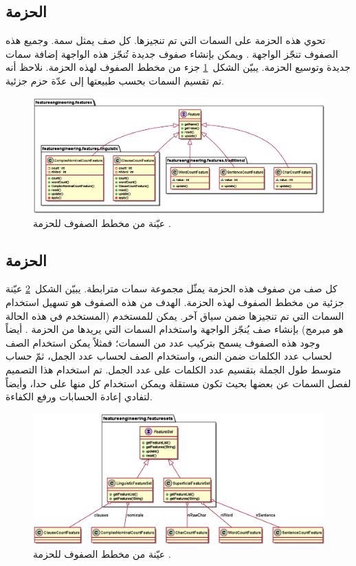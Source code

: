 \subsection{الحزمة }
تحوي هذه الحزمة على السمات التي تم تنجيزها.
كل صف يمثل سمة.
وجميع هذه الصفوف تنجّز الواجهة .
ويمكن بإنشاء صفوف جديدة تُنجّز هذه الواجهة إضافة سمات جديدة وتوسيع الحزمة.
يبيّن الشكل~\ref{fig:cd:features} جزء من مخطط الصفوف لهذه الحزمة.
نلاحظ أنه تم تقسيم السمات بحسب طبيعتها إلى عدّة حزم جزئية.

\begin{figure}[htb]
	\centering
	\includegraphics[width=0.95\linewidth]{images/cd-features.eps}
	\caption{%
		عيّنة من مخطط الصفوف للحزمة .
	}
	\label{fig:cd:features}
\end{figure}



\subsection{الحزمة }
كل صف من صفوف هذه الحزمة يمثّل مجموعة سمات مترابطة.
يبيّن الشكل~\ref{fig:cd:featuresets} عيّنة جزئية من مخطط الصفوف لهذه الحزمة.
الهدف من هذه الصفوف هو تسهيل استخدام السمات التي تم تنجيزها ضمن سياق آخر.
يمكن للمستخدم (المستخدم في هذه الحالة هو مبرمج) بإنشاء صف يُنجّز الواجهة 
واستخدام السمات التي يريدها من الحزمة .
أيضاً وجود هذه الصفوف يسمح بتركيب عدد من السمات؛
فمثلاً يمكن استخدام الصف  لحساب عدد الكلمات ضمن النص،
واستخدام الصف  لحساب عدد الجمل،
ثمّ حساب متوسط طول الجملة بتقسيم عدد الكلمات على عدد الجمل.
تم استخدام هذا التصميم لفصل السمات عن بعضها بحيث تكون مستقلة ويمكن استخدام كل منها على حدا،
وأيضاً لتفادي إعادة الحسابات ورفع الكفاءة.


\begin{figure}[htb]
	\centering
	\includegraphics[width=0.95\linewidth]{images/cd-featuresets.eps}
	\caption{%
		عيّنة من مخطط الصفوف للحزمة .
	}
	\label{fig:cd:featuresets}
\end{figure}



